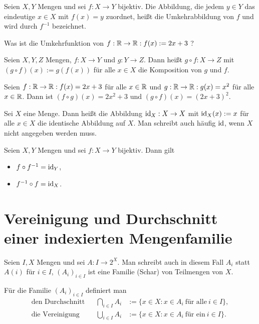 \begin{defn} 
Seien $ X,Y $ Mengen und sei $ f : X \to Y $ bijektiv. Die Abbildung, die jedem $ y \in Y $ das eindeutige $ x \in X $ mit $ f(x) = y $ zuordnet, heißt die Umkehrabbildung von $ f $ und wird durch $ f^{-1} $ bezeichnet.
\end{defn} 

\begin{aufg}
	Was ist die Umkehrfunktion von $ f : \mathbb{R} \to \mathbb{R} : f(x) := 2x + 3 $ ?
\end{aufg}


\begin{defn}
Seien $ X,Y,Z $ Mengen, $ f : X \to Y $ und $ g : Y \to Z $. Dann heißt $ g \circ f : X \to Z $ mit $ ( g \circ f )(x) := g( f(x) ) $ für alle $ x \in X $ die Komposition von $ g $ und $ f $.
\end{defn}

\begin{bsp}
	Seien $ f : \mathbb{R} \to \mathbb{R} : f(x) = 2x + 3 $ für alle $ x \in \mathbb{R} $ und $ g : \mathbb{R} \to \mathbb{R} : g(x) = x^2 $ für alle $ x \in \mathbb{R} $. Dann ist $ ( f \circ g )(x) = 2x^2 + 3 $ und $ ( g \circ f )(x) = (2x + 3)^2 $.
\end{bsp}


\begin{defn}
Sei $ X $ eine Menge. Dann heißt die Abbildung $ \operatorname{id}_X : X \to X $ mit $ \operatorname{id}_X(x) := x $ für alle $ x \in X $ die identische Abbildung auf $ X $. Man schreibt auch häufig $ \operatorname{id} $, wenn $ X $ nicht angegeben werden muss.
\end{defn}

\begin{bem}
	Seien $ X,Y $ Mengen und sei $ f : X \to Y $ bijektiv. Dann gilt
	\begin{itemize}
		\item $ f \circ f^{-1} = \operatorname{id}_Y $,
		\item $ f^{-1} \circ f = \operatorname{id}_X $.
	\end{itemize}
\end{bem} 

\section{Vereinigung und Durchschnitt einer indexierten Mengenfamilie}

\begin{defn}
Seien $ I,X $ Mengen und sei $ A : I \to 2^X $. Man schreibt auch in diesem Fall $ A_i $ statt $ A(i) $ für $ i \in I $, $ (A_i)_{i \in I} $ ist eine Familie (Schar) von Teilmengen von $ X $.

Für die Familie $ (A_i)_{i \in I} $ definiert man
\begin{align*}
	\text{den Durchschnitt} && \bigcap_{i \in I} A_i &:= \{ x \in X : x \in A_i \:\text{für alle}\: i \in I \},\\
	\text{die Vereinigung} && \bigcup_{i \in I} A_i &:= \{ x \in X : x \in A_i \:\text{für ein}\: i \in I \}.
\end{align*}
\end{defn} 

